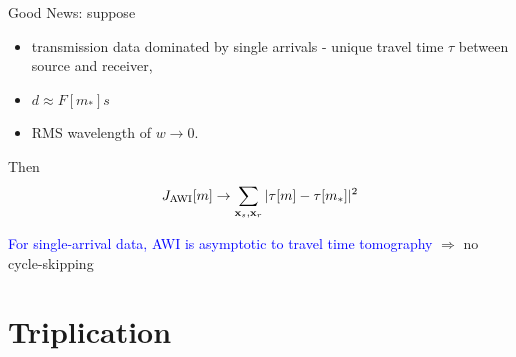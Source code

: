 \documentclass[xcolor=dvipsnames,12pt,aspectratio=169]{beamer}
\begin{document}

\begin{frame}
  Good News: suppose
  \begin{itemize}
  \item transmission data dominated by single arrivals - unique
    travel time $\tau$ between source and receiver,
  \item $d \approx F[m_*]s$
  \item RMS wavelength of $w \rightarrow 0$.
  \end{itemize}
  Then
  \[
    J_{\rm AWI}[m] \rightarrow \sum_{\mathbf{x}_s,\mathbf{x}_r} |\tau[m]-\tau[m_*]|^2
  \]

  \textcolor{blue}{For single-arrival data, AWI is asymptotic to
    travel time tomography} $\Rightarrow$ no cycle-skipping

  \end{frame}

  \section{Triplication}
\end{document}
